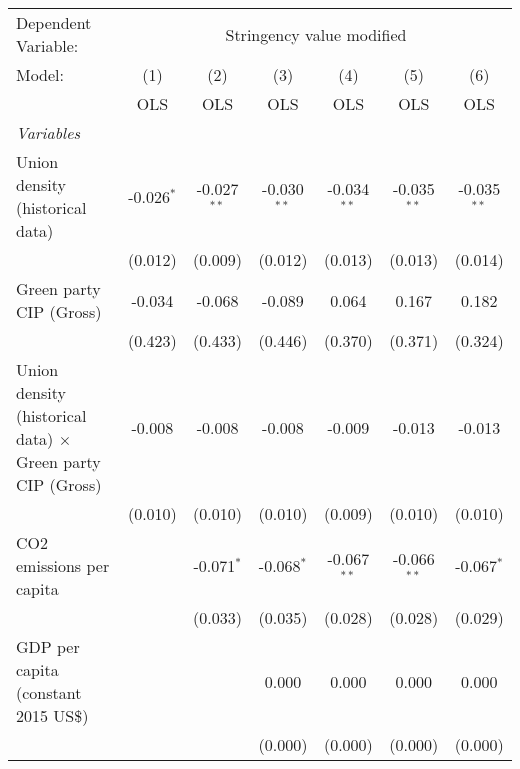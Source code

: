 
\begingroup
\centering
\begin{tabular}{lcccccc}
   \toprule
   Dependent Variable: & \multicolumn{6}{c}{Stringency value modified}\\
   Model:                                                            & (1)          & (2)           & (3)           & (4)           & (5)           & (6)\\  
                                                                     &  OLS         & OLS           & OLS           & OLS           & OLS           & OLS\\  
   \midrule
   \emph{Variables}\\
   Union density (historical data)                                   & -0.026$^{*}$ & -0.027$^{**}$ & -0.030$^{**}$ & -0.034$^{**}$ & -0.035$^{**}$ & -0.035$^{**}$\\   
                                                                     & (0.012)      & (0.009)       & (0.012)       & (0.013)       & (0.013)       & (0.014)\\   
   Green party CIP (Gross)                                           & -0.034       & -0.068        & -0.089        & 0.064         & 0.167         & 0.182\\   
                                                                     & (0.423)      & (0.433)       & (0.446)       & (0.370)       & (0.371)       & (0.324)\\   
   Union density (historical data) $\times$ Green party CIP (Gross)  & -0.008       & -0.008        & -0.008        & -0.009        & -0.013        & -0.013\\   
                                                                     & (0.010)      & (0.010)       & (0.010)       & (0.009)       & (0.010)       & (0.010)\\   
   CO2 emissions per capita                                          &              & -0.071$^{*}$  & -0.068$^{*}$  & -0.067$^{**}$ & -0.066$^{**}$ & -0.067$^{*}$\\   
                                                                     &              & (0.033)       & (0.035)       & (0.028)       & (0.028)       & (0.029)\\   
   GDP per capita (constant 2015 US\$)                               &              &               & 0.000         & 0.000         & 0.000         & 0.000\\   
                                                                     &              &               & (0.000)       & (0.000)       & (0.000)       & (0.000)\\   

\end{tabular}
